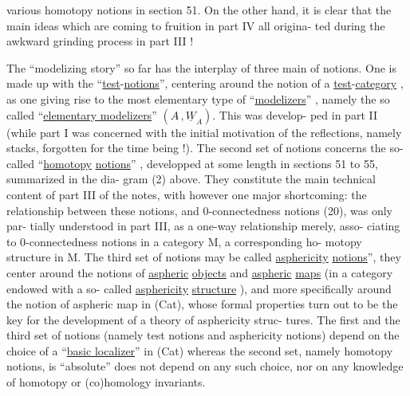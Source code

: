 
various homotopy notions in section 51.  On the other hand,  it is clear
that the main ideas which are coming to fruition in part IV  all origina-%
ted  during the awkward grinding process in part III  !

The  ``modelizing story''  so far has  the interplay
of three main  of notions.  One  is made up with the 
``\uline{test}-\uline{notions}'',  centering around the notion of a \uline{test}-\uline{category} ,  as
one giving rise to the most elementary type of ``\uline{modelizers}'' ,  namely the
so called ``\uline{elementary modelizers}'' $(A\hat{}\,,\underline{W}_A)$.   This was develop-%
ped in part II  (while part I was concerned with the initial motivation
of the reflections,  namely stacks,  forgotten for the time being !).
The second set of notions concerns the so-called ``\uline{homotopy} \uline{notions}'' ,
developped at some length  in sections 51 to 55,  summarized in the dia-%
gram (2) above.  They constitute the main technical content of part III
of the notes,  with however one major shortcoming:  the relationship
between these notions,  and 0-connectedness notions  (20),  was only par-%
tially understood in part III,  as a one-way relationship merely,  asso-%
ciating to  0-connectedness notions in a category M,  a corresponding ho-%
motopy structure in M.  The third set of notions  may
be called \uline{asphericity} \uline{notions}'',  they center around the notions of
\uline{aspheric} \uline{objects} and \uline{aspheric} \uline{maps} (in a category endowed with a so-%
called  \uline{asphericity} \uline{structure} ),  and more specifically around the
notion of  aspheric map in (Cat),  whose formal properties turn out to be
the  key for the development of a theory of asphericity struc-%
tures.  The first and the third set of notions  (namely test notions  and
asphericity notions)  depend on the choice of a ``\uline{basic localizer}''  in (Cat)\hand{\unsure{,}}
whereas the second set,  namely homotopy notions,  is ``absolute'' 
does not depend on any such choice,  nor on any knowledge of homotopy or
(co)homology invariants.

